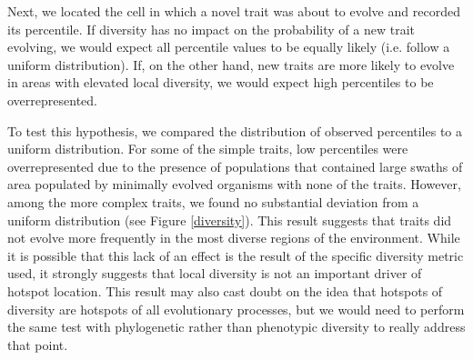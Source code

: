 \documentclass[letterpaper]{article}
\begin{document}
Next, we located the cell in which a novel trait was about to evolve and recorded its percentile. If diversity has no impact on the probability of a new trait evolving, we would expect all percentile values to be equally likely (i.e. follow a uniform distribution). If, on the other hand, new traits are more likely to evolve in areas with elevated local diversity, we would expect high percentiles to be overrepresented.

To test this hypothesis, we compared the distribution of observed percentiles to a uniform distribution. For some of the simple traits, low percentiles were overrepresented due to the presence of populations that contained large swaths of area populated by minimally evolved organisms with none of the traits. However, among the more complex traits, we found no substantial deviation from a uniform distribution (see Figure \ref{diversity}). This result suggests that traits did not evolve more frequently in the most diverse regions of the environment. While it is possible that this lack of an effect is the result of the specific diversity metric used, it strongly suggests that local diversity is not an important driver of hotspot location. This result may also cast doubt on the idea that hotspots of diversity are hotspots of all evolutionary processes, but we would need to perform the same test with phylogenetic rather than phenotypic diversity to really address that point.


\end{document}
